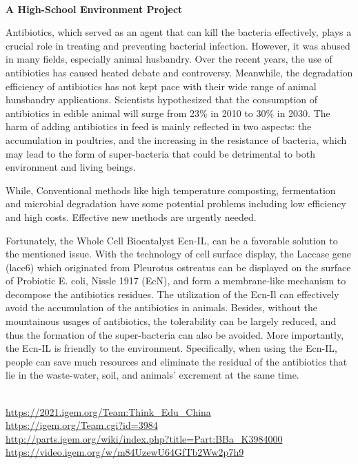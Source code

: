 \textbf{\\A High-School Environment Project\\}\begin{spacing}{1.5}

Antibiotics, which served as an agent that can kill the bacteria effectively, plays a crucial role in treating and preventing bacterial infection. However, it was abused in many fields, especially animal husbandry. Over the recent years, the use of antibiotics has caused heated debate and controversy. Meanwhile, the degradation efficiency of antibiotics has not kept pace with their wide range of animal hunsbandry applications. Scientists hypothesized that the consumption of antibiotics in edible animal will surge from 23\% in 2010 to 30\% in 2030. The harm of adding antibiotics in feed is mainly reflected in two aspects: the accumulation in poultries, and the increasing in the resistance of bacteria, which may lead to the form of super-bacteria that could be detrimental to both environment and living beings.

While, Conventional methods like high temperature composting, fermentation and microbial degradation have some potential problems including low efficiency and high costs. Effective new methods are urgently needed.

Fortunately, the Whole Cell Biocatalyst Ecn-IL, can be a favorable solution to the mentioned issue. With the technology of cell surface display, the Laccase gene (lacc6) which originated from Pleurotus ostreatus can be displayed on the surface of Probiotic E. coli, Nissle 1917 (EcN), and form a membrane-like mechanism to decompose the antibiotics residues. The utilization of the Ecn-Il can effectively avoid the accumulation of the antibiotics in animals. Besides, without the mountainous usages of antibiotics, the tolerability can be largely reduced, and thus the formation of the super-bacteria can also be avoided. More importantly, the Ecn-IL is friendly to the environment. Specifically, when using the Ecn-IL, people can save much resources and eliminate the residual of the antibiotics that lie in the waste-water, soil, and animals’ excrement at the same time.\end{spacing}
\\

\url{https://2021.igem.org/Team:Think\_Edu_China }\\
\url{https://igem.org/Team.cgi?id=3984 }\\
\url{http://parts.igem.org/wiki/index.php?title=Part:BBa_K3984000 }\\
\url{https://video.igem.org/w/m84UzewU64GfTb2Ww2p7h9 }\\

